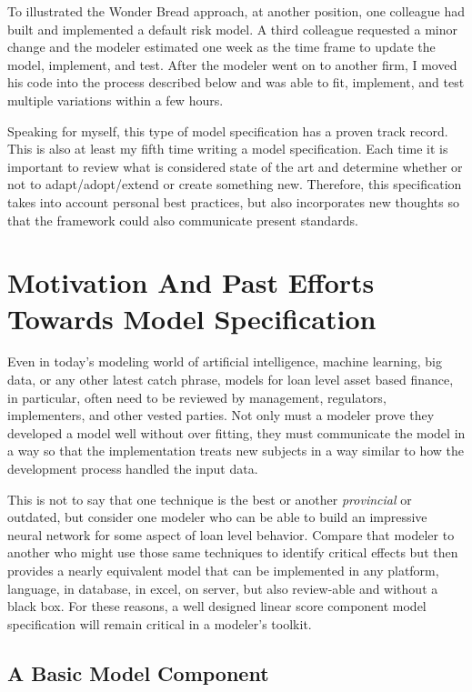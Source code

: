 \documentclass[10pt]{article}
\begin{document}
To illustrated the Wonder Bread approach, at another position, one colleague had built and implemented a default risk model. A third
colleague requested a minor change and the modeler estimated one week as the time frame to update the model, implement, and test.  After the
modeler went on to another firm, I moved his code into the process described below and was able to fit, implement, and test multiple
variations within a few hours.

Speaking for myself, this type of model specification has a proven track record.  This is also at least my fifth time writing a model
specification.  Each time it is important to review what is considered state of the art and determine whether or not to adapt/adopt/extend
or create something new.  Therefore, this specification takes into account personal best practices, but also incorporates new thoughts so
that the framework could also communicate present standards.

\fi

\section{Motivation And Past Efforts Towards Model Specification}

Even in today's modeling world of artificial intelligence, machine learning, big data, or any other latest catch phrase, models for loan
level asset based finance, in particular, often need to be reviewed by management, regulators, implementers, and other vested parties.  Not
only must a modeler prove they developed a model well without over fitting, they must communicate the model in a way so that the implementation
treats new subjects in a way similar to how the development process handled the input data.

This is not to say that one technique is the best or another {\em provincial} or outdated, but consider one modeler who
can be able to build an impressive neural network for some aspect of loan level behavior.  Compare that modeler to another who
might use those same techniques to identify critical effects but then provides a nearly equivalent model that can be 
implemented in any platform, language, in database, in excel, on server, but also review-able and without a black box.
For these reasons, a well designed linear score component model specification will remain  critical in a modeler's toolkit.

\subsection{A Basic Model Component}\label{basic_model_component}
\end{document}
